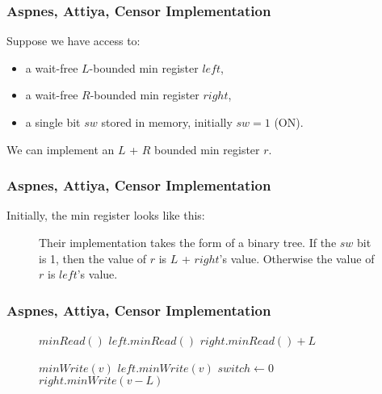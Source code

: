 \documentclass{beamer}
\makeatletter
\newcommand{\alglinenoNew}[1]{\newcounter{ALG@line@#1}}
\newcommand{\alglinenoPop}[1]{\setcounter{ALG@line}{\value{ALG@line@#1}}}
\newcommand{\alglinenoPush}[1]{\setcounter{ALG@line@#1}{\value{ALG@line}}}
\makeatother
\begin{document}
\begin{frame}
	\frametitle{Aspnes, Attiya, Censor Implementation}
	Suppose we have access to:
	\begin{itemize}
		\item a wait-free $L$-bounded min register $left$,
		\item a wait-free $R$-bounded min register $right$, 
		\item a single bit $sw$ stored in memory, initially $sw = 1$ (ON).
	\end{itemize}
	We can implement an $L$ + $R$ bounded min register $r$.
\end{frame}
\begin{frame}
	\frametitle{Aspnes, Attiya, Censor Implementation}
	Initially, the min register looks like this:
	\begin{figure}[H]
		\centering
		\caption{Their implementation takes the form of a binary tree. If the $sw$ bit is 1, then the value of $r$ is $L$ + $right$'s value.
		Otherwise the value of $r$ is $left$'s value.}
	\end{figure}
\end{frame}
\begin{frame}
	\frametitle{Aspnes, Attiya, Censor Implementation}
\begin{figure}[H]
    \begin{algorithmic}[1]
        \State $minRead()$
        \Indent
                \State \Return $left.minRead()$
            \Else
                \State \Return $right.minRead() + L$
            \EndIf
        \EndIndent   
    \alglinenoNew{alg2}
    \alglinenoPush{alg2}
    \end{algorithmic}
	\begin{algorithmic}[1]
		\alglinenoPop{alg2}
			\State $minWrite(v)$
			\Indent
					\State $left.minWrite(v)$
					\State $switch \gets 0$ 
				\Else
						\State $right.minWrite(v - L)$
					\EndIf
				\EndIf
			\EndIndent   
		\alglinenoPush{alg2}
		\end{algorithmic}
\end{figure}
\end{frame}
\end{document}
